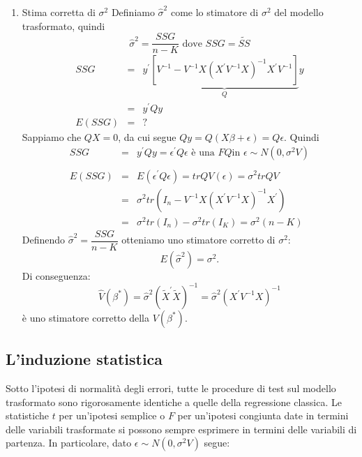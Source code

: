 \documentclass[a4paper]{report}
\theoremstyle{remark}
\begin{document}
\begin{enumerate}
\item Stima corretta di $\sigma ^{2}$\newline
Definiamo $\hat{\sigma}^{2}$ come lo stimatore di $\sigma ^{2}$ del modello
trasformato, quindi 
\begin{equation*}
\hat{\sigma}^{2}=\dfrac{SSG}{n-K}\text{ dove }SSG=\tilde{SS}
\end{equation*}%
\begin{eqnarray*}
SSG &=&y^{\prime }\underset{Q}{\underbrace{\left[ V^{-1}-V^{-1}X(X^{\prime
}V^{-1}X)^{-1}X^{\prime }V^{-1}\right] }}y \\
&=&y^{\prime }Qy \\
E(SSG) &=&?
\end{eqnarray*}%
Sappiamo che $QX=0$, da cui segue $Qy=Q(X\beta +\epsilon )=Q\epsilon $.%
\newline
Quindi 
\begin{eqnarray*}
SSG &=&y^{\prime }Qy=\epsilon ^{\prime }Q\epsilon \text{ \`{e} una }FQ\text{
in }\epsilon \sim N(0,\sigma ^{2}V) \\
&& \\
E(SSG) &=&E(\epsilon ^{\prime }Q\epsilon )=trQV(\epsilon )=\sigma ^{2}trQV \\
&=&\sigma ^{2}tr(I_{n}-V^{-1}X(X^{\prime }V^{-1}X)^{-1}X^{\prime }) \\
&=&\sigma ^{2}tr(I_{n})-\sigma ^{2}tr(I_{K})=\sigma ^{2}(n-K)
\end{eqnarray*}%
Definendo $\hat{\sigma}^{2}=\dfrac{SSG}{n-K}$ otteniamo uno stimatore
corretto di $\sigma ^{2}$:%
\begin{equation*}
E(\hat{\sigma}^{2})=\sigma ^{2}.
\end{equation*}%
Di conseguenza:%
\begin{equation*}
\hat{V}(\beta ^{\ast })=\hat{\sigma}^{2}(\tilde{X}^{\prime }\tilde{X})^{-1}=%
\hat{\sigma}^{2}(X^{\prime }V^{-1}X)^{-1}
\end{equation*}%
\`{e} uno stimatore corretto della $V(\beta ^{\ast })$.
\end{enumerate}

\subsection{L'induzione statistica}

Sotto l'ipotesi di normalit\`{a} degli errori, tutte le procedure di test
sul modello trasformato sono rigorosamente identiche a quelle della
regressione classica. Le statistiche $t$ per un'ipotesi semplice o $F$ per
un'ipotesi congiunta date in termini delle variabili trasformate si possono
sempre esprimere in termini delle variabili di partenza. In particolare,
dato $\epsilon \sim N(0,\sigma ^{2}V)$ segue:
\end{document}
